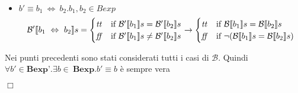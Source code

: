 {\begin{enumerate}[label=(\alph*)]
\begin{itemize}
\begin{align*}
\begin{cases}
      \semtrue & 
      \mbox{if} \ \lnot ( \B{b_1} = \semtrue 
                \ \mbox{ and } \
                (\B{b_1} \ \mbox{and} \ \B{b_2}) = \semfalse)\\ 
      \semfalse & 
      \mbox{if} \ \B{b_1} = \semtrue \ \mbox{ and } \ 
                \B{b_2} = \semfalse \\ 
      \end{cases} 
    \end{align*} 
    \item $ b' \equiv b_1 \ \Leftrightarrow \ b_2. b_1, b_2 \in Bexp $ \\ 
    \begin{align*}
      \mathcal{B'} \llbracket b_1 \ \Leftrightarrow \ b_2 \rrbracket s = 
      \begin{cases} 
      \mbox{\textit{tt}} & 
      \mbox{if} \ \mathcal{B'} \llbracket b_1 \rrbracket s = \mathcal{B'} \llbracket b_2 \rrbracket s\\
      \mbox{\textit{ff}} & 
      \mbox{if} \ \mathcal{B'} \llbracket b_1 \rrbracket s \neq \mathcal{B'} \llbracket b_2 \rrbracket s\\        
      \end{cases} 
      \rightarrow
      \begin{cases} 
      \mbox{\textit{tt}} & 
      \mbox{if} \ \mathcal{B} \llbracket b_1 \rrbracket s = \mathcal{B} \llbracket b_2 \rrbracket s\\
      \mbox{\textit{ff}} & 
      \mbox{if} \ \lnot (\mathcal{B} \llbracket b_1 \rrbracket s = \mathcal{B} \llbracket b_2 \rrbracket s)\\        
      \end{cases} 
    \end{align*} 
  \end{itemize}
\end{enumerate}
Nei punti precedenti sono stati considerati tutti i casi di $\mathcal{B}$. Quindi
$\forall b' \in \textbf{Bexp'}.\exists b \in \ \textbf{Bexp}.b' \equiv b$
è sempre vera
\begin{flushright}
$\Box$
\end{flushright}
}